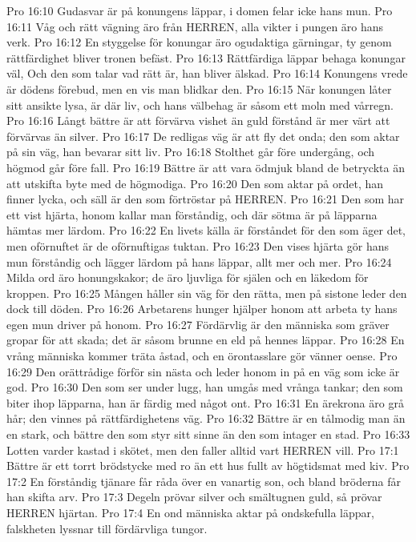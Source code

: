 Pro 16:10  Gudasvar är på konungens läppar, i domen felar icke hans mun.
Pro 16:11  Våg och rätt vägning äro från HERREN, alla vikter i pungen äro hans verk.
Pro 16:12  En styggelse för konungar äro ogudaktiga gärningar, ty genom rättfärdighet bliver tronen befäst.
Pro 16:13  Rättfärdiga läppar behaga konungar väl, Och den som talar vad rätt är, han bliver älskad.
Pro 16:14  Konungens vrede är dödens förebud, men en vis man blidkar den.
Pro 16:15  När konungen låter sitt ansikte lysa, är där liv, och hans välbehag är såsom ett moln med vårregn.
Pro 16:16  Långt bättre är att förvärva vishet än guld förstånd är mer värt att förvärvas än silver.
Pro 16:17  De redligas väg är att fly det onda; den som aktar på sin väg, han bevarar sitt liv.
Pro 16:18  Stolthet går före undergång, och högmod går före fall.
Pro 16:19  Bättre är att vara ödmjuk bland de betryckta än att utskifta byte med de högmodiga.
Pro 16:20  Den som aktar på ordet, han finner lycka, och säll är den som förtröstar på HERREN.
Pro 16:21  Den som har ett vist hjärta, honom kallar man förståndig, och där sötma är på läpparna hämtas mer lärdom.
Pro 16:22  En livets källa är förståndet för den som äger det, men oförnuftet är de oförnuftigas tuktan.
Pro 16:23  Den vises hjärta gör hans mun förståndig och lägger lärdom på hans läppar, allt mer och mer.
Pro 16:24  Milda ord äro honungskakor; de äro ljuvliga för själen och en läkedom för kroppen.
Pro 16:25  Mången håller sin väg för den rätta, men på sistone leder den dock till döden.
Pro 16:26  Arbetarens hunger hjälper honom att arbeta ty hans egen mun driver på honom.
Pro 16:27  Fördärvlig är den människa som gräver gropar för att skada; det är såsom brunne en eld på hennes läppar.
Pro 16:28  En vrång människa kommer träta åstad, och en örontasslare gör vänner oense.
Pro 16:29  Den orättrådige förför sin nästa och leder honom in på en väg som icke är god.
Pro 16:30  Den som ser under lugg, han umgås med vrånga tankar; den som biter ihop läpparna, han är färdig med något ont.
Pro 16:31  En ärekrona äro grå hår; den vinnes på rättfärdighetens väg.
Pro 16:32  Bättre är en tålmodig man än en stark, och bättre den som styr sitt sinne än den som intager en stad.
Pro 16:33  Lotten varder kastad i skötet, men den faller alltid vart HERREN vill.
Pro 17:1  Bättre är ett torrt brödstycke med ro än ett hus fullt av högtidsmat med kiv.
Pro 17:2  En förståndig tjänare får råda över en vanartig son, och bland bröderna får han skifta arv.
Pro 17:3  Degeln prövar silver och smältugnen guld, så prövar HERREN hjärtan.
Pro 17:4  En ond människa aktar på ondskefulla läppar, falskheten lyssnar till fördärvliga tungor.

